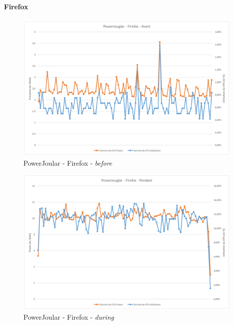 \documentclass[12pt, a4paper]{report}
\begin{document}
\paragraph{
\textbf{Firefox}\newline}
\begin{figure}[H]
    \includegraphics[width=1\linewidth]{res//graph/PowerJoular/ff-avant.png}
    \caption{PowerJoular - Firefox - \textit{before}}
    \label{fig:pj_ff_before}
\end{figure}
\begin{figure}[H]
    \includegraphics[width=1\linewidth]{res//graph/PowerJoular/ff-during.png}
    \caption{PowerJoular - Firefox - \textit{during}}
    \label{fig:pj_ff_during}
\end{figure}
\end{document}
